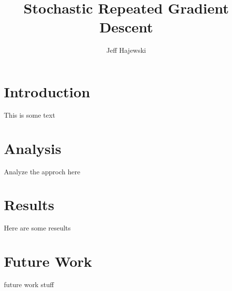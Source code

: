 \documentclass{article}
\title{Stochastic Repeated Gradient Descent}
\author{Jeff Hajewski}
\begin{document}
\maketitle

\section{Introduction}
This is some text

\section{Analysis}
Analyze the approch here

\section{Results}
Here are some reseults

\section{Future Work}
future work stuff 
\end{document}
